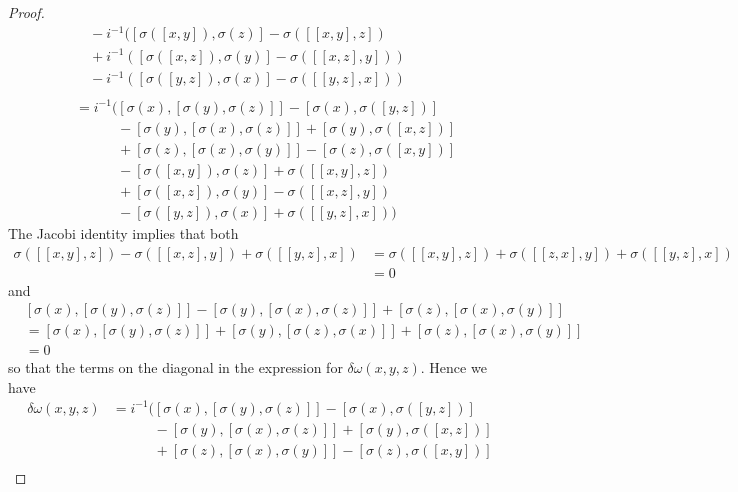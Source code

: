 \begin{proof}
\begin{align*}
                          &\quad - i^{-1}([\sigma([x, y]), \sigma(z)]-\sigma([[x,y], z]) \\
                          &\quad + i^{-1}([\sigma([x, z]), \sigma(y)] -\sigma([[x,z], y])) \\
                          &\quad - i^{-1}([\sigma([y, z]), \sigma(x)] -\sigma([[y,z], x])) \\ \\
                          &= i^{-1}([\sigma(x), [\sigma(y), \sigma(z)]] - [\sigma(x), \sigma([y, z])] \\
                          &\quad\quad\quad - [\sigma(y), [\sigma(x), \sigma(z)]] + [\sigma(y), \sigma([x, z])] \\
                          &\quad\quad\quad + [\sigma(z), [\sigma(x), \sigma(y)]] - [\sigma(z), \sigma([x, y])] \\
                          &\quad\quad\quad - [\sigma([x, y]), \sigma(z)]+\sigma([[x,y], z]) \\
                          &\quad\quad\quad + [\sigma([x, z]), \sigma(y)] -\sigma([[x,z], y]) \\
                          &\quad\quad\quad - [\sigma([y, z]), \sigma(x)] +\sigma([[y,z], x]))
  \end{align*}
  The Jacobi identity implies that both
  \begin{align*}
    \sigma([[x,y], z]) - \sigma([[x, z], y]) + \sigma([[y,z], x]) &= \sigma([[x,y], z]) + \sigma([[z, x], y]) + \sigma([[y,z], x]) \\&= 0
  \end{align*}
  and
  \begin{align*}
    &[\sigma(x), [\sigma(y), \sigma(z)]] -
    [\sigma(y), [\sigma(x), \sigma(z)]] +
    [\sigma(z), [\sigma(x), \sigma(y)]]\\ &=
    [\sigma(x), [\sigma(y), \sigma(z)]] +
    [\sigma(y), [\sigma(z), \sigma(x)]] +
    [\sigma(z), [\sigma(x), \sigma(y)]]\\ &= 0
  \end{align*}
  so that the terms on the diagonal in the expression for $ \delta\omega(x,y,z) $. Hence we have
  \begin{align*}
    \delta\omega(x,y,z) &= i^{-1}([\sigma(x), [\sigma(y), \sigma(z)]] - [\sigma(x), \sigma([y, z])] \\
                          &\quad\quad\quad - [\sigma(y), [\sigma(x), \sigma(z)]] + [\sigma(y), \sigma([x, z])] \\
                          &\quad\quad\quad + [\sigma(z), [\sigma(x), \sigma(y)]] - [\sigma(z), \sigma([x, y])] \\

\end{align*}
\end{proof}
